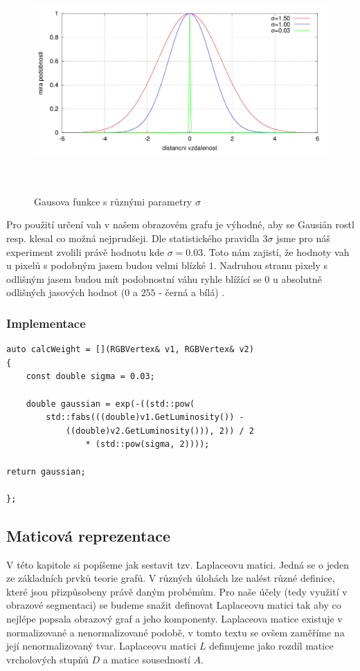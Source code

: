 \documentclass[czech, master, public, dept460, male, cpdeclaration, oneside]{diploma}
\begin{document}
\begin{figure}[H]
	\vspace*{+3.0mm}
	\centering
	\includegraphics[height=8.5cm]{Figures/explanatory/gaussians.png}
	\caption{Gausova funkce s různými parametry $\sigma$ \cite{Pecha}}
\end{figure}
\noindent
Pro použití určení vah v našem obrazovém grafu je výhodné, aby se Gausián rostl resp. klesal co možná nejprudšeji. Dle statistického pravidla $3\sigma$ jsme pro náš experiment zvolili právě hodnotu kde $\sigma = 0.03$. Toto nám zajistí, že hodnoty vah u pixelů s podobným jasem budou velmi blízké $1$. Nadruhou stranu pixely s odlišným jasem budou mít podobnostní váhu ryhle blížící se $0$ u absolutně odlišných jasových hodnot ($0$ a $255$ - černá a bílá) .

\subsubsection{Implementace}
\begin{lstlisting}[label=src:Cpp,caption=Lambda funkce pro výpočet váhy grafu v C++]
auto calcWeight = [](RGBVertex& v1, RGBVertex& v2) 
{
	const double sigma = 0.03;

	double gaussian = exp(-((std::pow(
		std::fabs(((double)v1.GetLuminosity()) - 
			((double)v2.GetLuminosity())), 2)) / 2 
				* (std::pow(sigma, 2))));

return gaussian;

};
\end{lstlisting}

\subsection{Maticová reprezentace}
V této kapitole si popíšeme jak sestavit tzv. Laplaceovu matici. Jedná se o jeden ze základních prvků teorie grafů. V různých úlohách lze nalést různé definice, které jsou přizpůsobeny právě daným probémům. Pro naše účely (tedy využití v obrazové segmentaci) se budeme snažit definovat Laplaceovu matici tak aby co nejlépe popsala obrazový graf a jeho komponenty. Laplaceova matice existuje v normalizované a nenormalizované podobě, v tomto textu se ovšem zaměříme na její nenormalizovaný tvar. Laplaceovu matici $L$ definujeme jako rozdíl matice vrcholových stupňů $D$ a matice sousedností $A$. \cite{Dostal} \par
\end{document}
